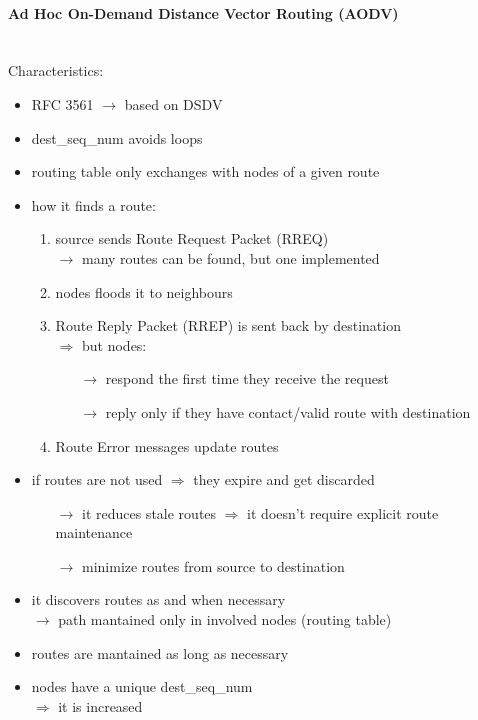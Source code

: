 \paragraph{Ad Hoc On-Demand Distance Vector Routing (AODV)}\mbox{}\\[0.2cm]
Characteristics:
\begin{itemize}
    \item RFC 3561 $\rightarrow$ based on DSDV
    \item dest\_seq\_num avoids loops
    \item routing table only exchanges with nodes of a given route
    \item how it finds a route:
    \begin{enumerate}
        \item source sends Route Request Packet (RREQ)\\$\rightarrow$ many routes can be found, but one implemented
        \item nodes floods it to neighbours
        \item Route Reply Packet (RREP) is sent back by destination\\
        $\Rightarrow$ but nodes:
        \begin{itemize}
            \item[$\rightarrow$] respond the first time they receive the request
            \item[$\rightarrow$] reply only if they have contact/valid route with destination
        \end{itemize}
        \item Route Error messages update routes
    \end{enumerate}
    \item if routes are not used $\Rightarrow$ they expire and get discarded
    \begin{itemize}
        \item[$\rightarrow$] it reduces stale routes $\Rightarrow$ it doesn't require explicit route maintenance
        \item[$\rightarrow$] minimize routes from source to destination
    \end{itemize}
        \item it discovers routes as and when necessary\\$\rightarrow$ path mantained only in involved nodes (routing table)
        \item routes are mantained as long as necessary
        \item nodes have a unique dest\_seq\_num\\$\Rightarrow$ it is increased

\end{itemize}
